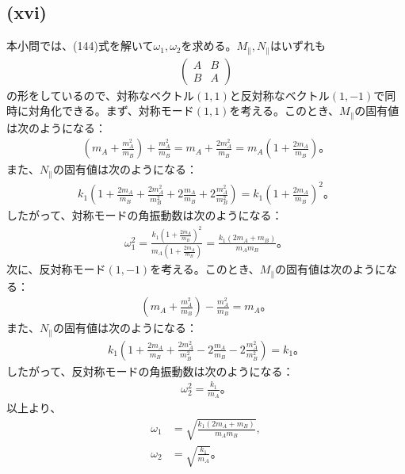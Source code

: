   \subsection*{(xvi)}
  本小問では、(144)式を解いて$\omega_1,\omega_2$を求める。$M_\parallel,N_\parallel$はいずれも
  \begin{align*}
    \begin{pmatrix}
      A & B \\
      B & A
    \end{pmatrix}
  \end{align*}
  の形をしているので、対称なベクトル$(1,1)$と反対称なベクトル$(1,-1)$で同時に対角化できる。まず、対称モード$(1,1)$を考える。このとき、$M_\parallel$の固有値は次のようになる：
  \begin{align*}
    \left(m_A+\frac{m_A^2}{m_B}\right)+\frac{m_A^2}{m_B}=m_A+\frac{2m_A^2}{m_B}=m_A\left(1+\frac{2m_A}{m_B}\right)。
  \end{align*}
  また、$N_\parallel$の固有値は次のようになる：
  \begin{align*}
    k_1\left(1+\frac{2m_A}{m_B}+\frac{2m_A^2}{m_B^2}+2\frac{m_A}{m_B}+2\frac{m_A^2}{m_B^2}\right)
    =
    k_1\left(1+\frac{2m_A}{m_B}\right)^2。
  \end{align*}
  したがって、対称モードの角振動数は次のようになる：
  \begin{align*}
    \omega_1^2=\frac{k_1\left(1+\frac{2m_A}{m_B}\right)^2}{m_A\left(1+\frac{2m_A}{m_B}\right)}=\frac{k_1(2m_A+m_B)}{m_Am_B}。
  \end{align*}
  次に、反対称モード$(1,-1)$を考える。このとき、$M_\parallel$の固有値は次のようになる：
  \begin{align*}
    \left(m_A+\frac{m_A^2}{m_B}\right)-\frac{m_A^2}{m_B}=m_A。
  \end{align*}
  また、$N_\parallel$の固有値は次のようになる：
  \begin{align*}
    k_1\left(1+\frac{2m_A}{m_B}+\frac{2m_A^2}{m_B^2}-2\frac{m_A}{m_B}-2\frac{m_A^2}{m_B^2}\right)=k_1。
  \end{align*}
  したがって、反対称モードの角振動数は次のようになる：
  \begin{align*}
    \omega_2^2=\frac{k_1}{m_A}。
  \end{align*}
  以上より、
  \begin{align*}
    \omega_1&=\sqrt{\frac{k_1(2m_A+m_B)}{m_Am_B}},\tag{145}\\
    \omega_2&=\sqrt{\frac{k_1}{m_A}}。\tag{146}
  \end{align*}
  
